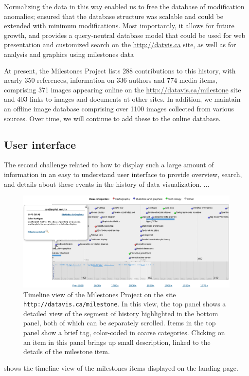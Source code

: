 Normalizing the data in this way enabled us to free the database of modification anomalies; ensured that the database 
structure was scalable and could be extended with minimum modifications.
Most importantly, it allows for future growth, and provides a query-neutral database model
\citep{Codd:1971} that could be used for web presentation and customized search
on the \url{http://datvis.ca} site, 
as well as for analysis and graphics using milestones data

At present, the Milestones Project lists 288 contributions to this history, with nearly 350 references,
information on 336 authors and 774 media items, comprising 371 images appearing online on the
\url{http://datavis.ca/milestone} site and 403 links to images and documents at other sites.
In addition, we maintain an offline image database comprising over 1100 images collected from
various sources. Over time, we will continue to add these to the online database.

\subsection{User interface}
The second challenge related to how to display such a large amount of information in an easy to understand
user interface to provide overview, search, and details about these events in the history of
data visualization. ...

\begin{figure}[!htb]
  \centering
  \includegraphics[width=\textwidth,clip]{fig/datavis-timeline2}
  \caption{Timeline view of the Milestones Project on the site \texttt{http://datavis.ca/milestone}. In this view,
  the top panel shows a detailed view of the segment of history highlighted in the bottom panel, both
  of which can be separately scrolled. Items in the top panel show a brief tag, color-coded in coarse
  categories. Clicking on an item in this panel brings up small description, linked to the details of
  the milestone item.
  }
  \label{fig:datavis-timeline2}
\end{figure}


 shows the timeline view of the milestones items displayed on the
landing page. 

